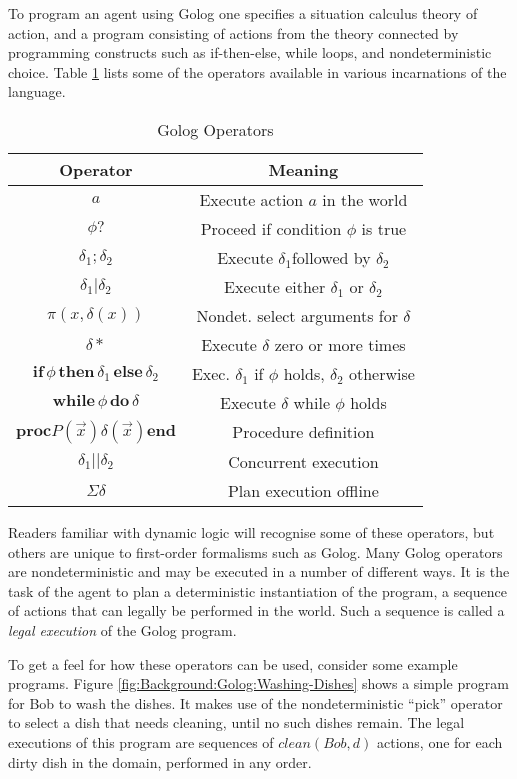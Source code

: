 To program an agent using Golog one specifies a situation calculus
theory of action, and a program consisting of actions from the theory
connected by programming constructs such as if-then-else, while loops,
and nondeterministic choice. Table \ref{tbl:Background:Golog-Operators}
lists some of the operators available in various incarnations of the
language.%
\begin{table}[h]
 

\begin{centering}
\begin{tabular}{|c|c|}
\hline 
Operator  & Meaning\tabularnewline
\hline
\hline 
$a$  & Execute action $a$ in the world\tabularnewline
\hline 
$\phi?$  & Proceed if condition $\phi$ is true\tabularnewline
\hline 
$\delta_{1};\delta_{2}$  & Execute $\delta_{1}$followed by $\delta_{2}$\tabularnewline
\hline 
$\delta_{1}|\delta_{2}$  & Execute either $\delta_{1}$ or $\delta_{2}$\tabularnewline
\hline 
$\pi(x,\delta(x))$  & Nondet. select arguments for $\delta$\tabularnewline
\hline 
$\delta*$  & Execute $\delta$ zero or more times\tabularnewline
\hline 
$\mathbf{if}\,\phi\,\mathbf{then}\,\delta_{1}\,\mathbf{else}\,\delta_{2}$  & Exec. $\delta_{1}$ if $\phi$ holds, $\delta_{2}$ otherwise\tabularnewline
\hline 
$\mathbf{while\,}\phi\mathbf{\, do}\,\delta$  & Execute $\delta$ while $\phi$ holds\tabularnewline
\hline 
$\mathbf{proc}P(\overrightarrow{x})\delta(\overrightarrow{x})\mathbf{end}$  & Procedure definition\tabularnewline
\hline 
$\delta_{1}||\delta_{2}$  & Concurrent execution\tabularnewline
\hline 
$\Sigma\delta$  & Plan execution offline\tabularnewline
\hline
\end{tabular}
\par\end{centering}

\caption{Golog Operators\label{tbl:Background:Golog-Operators} }

\end{table}


Readers familiar with dynamic logic will recognise some of these operators,
but others are unique to first-order formalisms such as Golog. Many
Golog operators are nondeterministic and may be executed in a number
of different ways. It is the task of the agent to plan a deterministic
instantiation of the program, a sequence of actions that can legally
be performed in the world. Such a sequence is called a \emph{legal
execution} of the Golog program.

To get a feel for how these operators can be used, consider some example
programs. Figure \ref{fig:Background:Golog:Washing-Dishes} shows
a simple program for Bob to wash the dishes. It makes use of the nondeterministic
{}``pick'' operator to select a dish that needs cleaning, until
no such dishes remain. The legal executions of this program are sequences
of $clean(Bob,d)$ actions, one for each dirty dish in the domain,
performed in any order.

